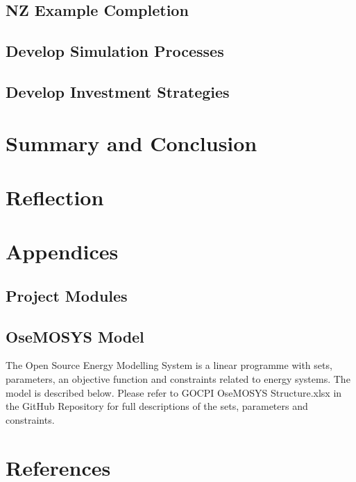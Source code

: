 \documentclass[12pt]{article}
\begin{document}
\subsection{NZ Example Completion} \label{FutureWork}
\subsection{Develop Simulation Processes}
\subsection{Develop Investment Strategies}
\newpage
\section{Summary and Conclusion}
\newpage
\section{Reflection}
\newpage
\section{Appendices}
\subsection{Project Modules}
\subsection{OseMOSYS Model}
The Open Source Energy Modelling System is a linear programme with sets, parameters, an objective function and constraints related to energy systems.
The model is described below. Please refer to GOCPI OseMOSYS Structure.xlsx in the GitHub Repository for full descriptions of the sets, parameters and constraints.
%
\newpage
\section{References}
\printbibliography
\end{document}
